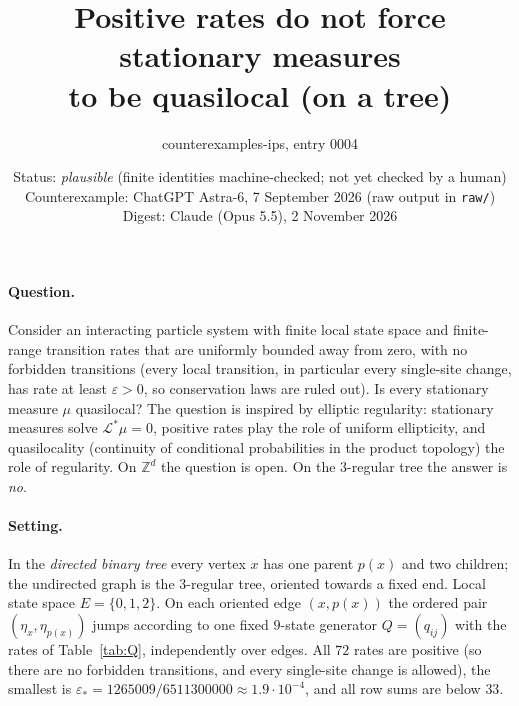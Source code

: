 \documentclass[11pt]{article}
\title{Positive rates do not force stationary measures\\ to be quasilocal (on a tree)}
\author{counterexamples-ips, entry 0004}
\date{Status: \emph{plausible} (finite identities machine-checked; not yet checked by a human)\\[2pt]\small Counterexample: ChatGPT Astra-6, 7 September 2026 (raw output in \texttt{raw/})\\ Digest: Claude (Opus 5.5), 2 November 2026}
\newcommand{\Z}{\mathbb{Z}}
\newcommand{\cL}{\mathscr{L}}
\begin{document}
\maketitle

\paragraph{Question.} Consider an interacting particle system with finite local state space and finite-range transition rates that are uniformly bounded away from zero, with no forbidden transitions (every local transition, in particular every single-site change, has rate at least $\varepsilon>0$, so conservation laws are ruled out). Is every stationary measure $\mu$ quasilocal? The question is inspired by elliptic regularity: stationary measures solve $\cL^*\mu=0$, positive rates play the role of uniform ellipticity, and quasilocality (continuity of conditional probabilities in the product topology) the role of regularity. On $\Z^d$ the question is open. On the $3$-regular tree the answer is \emph{no}.

\paragraph{Setting.} In the \emph{directed binary tree} every vertex $x$ has one parent $p(x)$ and two children; the undirected graph is the $3$-regular tree, oriented towards a fixed end. Local state space $E=\{0,1,2\}$. On each oriented edge $(x,p(x))$ the ordered pair $(\eta_x,\eta_{p(x)})$ jumps according to one fixed $9$-state generator $Q=(q_{ij})$ with the rates of Table~\ref{tab:Q}, independently over edges. All $72$ rates are positive (so there are no forbidden transitions, and every single-site change is allowed), the smallest is $\varepsilon_*=1265009/6511300000\approx1.9\cdot10^{-4}$, and all row sums are below $33$.
\end{document}
